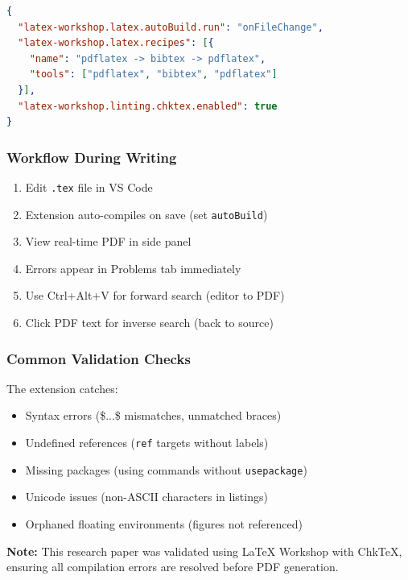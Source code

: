 \documentclass[10pt,twocolumn,a4paper]{article}
\begin{document}
\begin{lstlisting}[language=json, basicstyle=\ttfamily\tiny]
{
  "latex-workshop.latex.autoBuild.run": "onFileChange",
  "latex-workshop.latex.recipes": [{
    "name": "pdflatex -> bibtex -> pdflatex",
    "tools": ["pdflatex", "bibtex", "pdflatex"]
  }],
  "latex-workshop.linting.chktex.enabled": true
}
\end{lstlisting}

\subsubsection{Workflow During Writing}

\begin{enumerate}
    \item Edit \texttt{.tex} file in VS Code
    \item Extension auto-compiles on save (set \texttt{autoBuild})
    \item View real-time PDF in side panel
    \item Errors appear in Problems tab immediately
    \item Use Ctrl+Alt+V for forward search (editor to PDF)
    \item Click PDF text for inverse search (back to source)
\end{enumerate}

\subsubsection{Common Validation Checks}

The extension catches:
\begin{itemize}
    \item Syntax errors (\$...\$ mismatches, unmatched braces)
    \item Undefined references (\texttt{ref} targets without labels)
    \item Missing packages (using commands without \texttt{usepackage})
    \item Unicode issues (non-ASCII characters in listings)
    \item Orphaned floating environments (figures not referenced)
\end{itemize}

\textbf{Note:} This research paper was validated using LaTeX Workshop with ChkTeX, ensuring all compilation errors are resolved before PDF generation.

\end{document}
